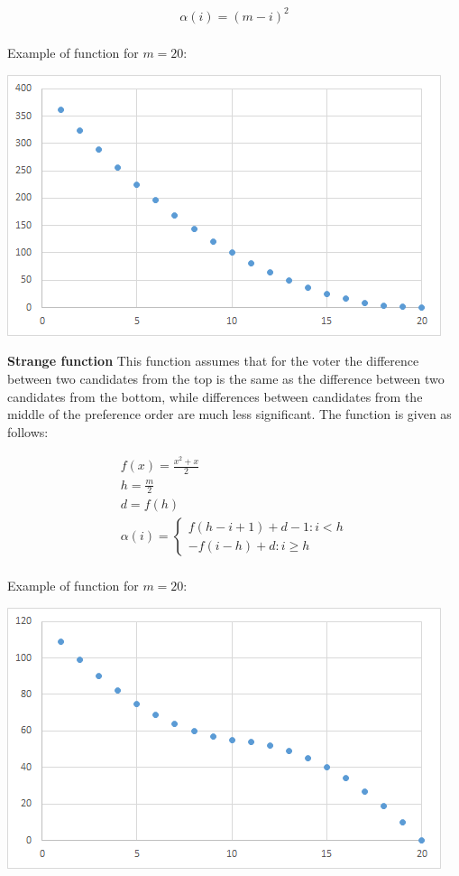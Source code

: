 \begin{gather}
	\alpha(i) = (m - i)^{2}
\end{gather}
\\

Example of function for $m = 20$:

\begin{center}
	\includegraphics[scale=0.75]{satfun1}
\end{center}

\noindent
\textbf{Strange function} \hspace{.1in} This function assumes that for the voter the difference between two candidates from the top is the same as the difference between two candidates from the bottom, while differences between candidates from the middle of the preference order are much less significant. The function is given as follows:

\begin{gather}
	f(x) = \frac{x^{2}+x}{2} \\
	h = \frac{m}{2} \\
	d = f(h) \\
	\alpha(i) = \begin{cases} f(h-i+1)+d-1 : i<h \\ -f(i-h)+d : i \geq h \end{cases}
\end{gather}
\\

Example of function for $m = 20$:

\begin{center}
	\includegraphics[scale=0.75]{satfun2}
\end{center}

